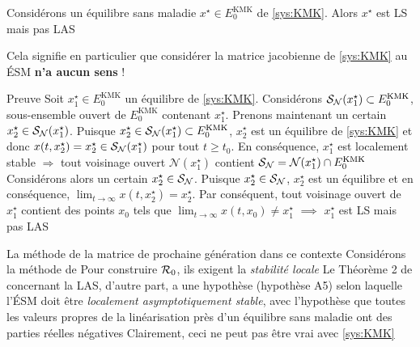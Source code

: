 \documentclass[aspectratio=169]{beamer}\usepackage[]{graphicx}\usepackage[]{xcolor}
\begin{document}
\begin{frame}
\begin{proposition}
Considérons un équilibre sans maladie $x^\star\in E_0^\text{KMK}$ de \eqref{sys:KMK}. Alors $x^\star$ est LS mais pas LAS  
\end{proposition}
\vfill
Cela signifie en particulier que considérer la matrice jacobienne de \eqref{sys:KMK} au ÉSM \textbf{n'a aucun sens} !
\end{frame}

\begin{frame}{Preuve}
Soit $x_1^\star\in E_0^\text{KMK}$ un équilibre de \eqref{sys:KMK}.
Considérons $\S_\mathcal{N}(x_1^\star)\subset E_0^\text{KMK}$, sous-ensemble ouvert de $E_0^\text{KMK}$ contenant $x_1^\star$.
Prenons maintenant un certain $x_2^\star\in\S_\mathcal{N}(x_1^\star)$. Puisque $x_2^\star\in\S_\mathcal{N}(x_1^\star)\subset E_0^\text{KMK}$, $x_2^\star$ est un équilibre de \eqref{sys:KMK} et donc $x(t,x_2^\star)=x_2^\star\in\S_\mathcal{N}(x_1^\star)$ pour tout $t\geq t_0$.
En conséquence, $x_1^\star$ est localement stable
\vfill
$\Rightarrow$ tout voisinage ouvert $\mathcal{N}(x_1^\star)$ contient $\S_\mathcal{N}=\mathcal{N}(x_1^\star)\cap E_0^\text{KMK}$
\vfill
Considérons alors un certain $x_2^\star\in\S_\mathcal{N}$.
Puisque $x_2^\star\in\S_\mathcal{N}$, $x_2^\star$ est un équilibre et en conséquence, $\lim_{t\to\infty}x(t,x_2^\star)=x_2^\star$.
Par conséquent, tout voisinage ouvert de $x_1^\star$ contient des points $x_0$ tels que $\lim_{t\to\infty}x(t,x_0)\neq x_1^\star$ $\implies$ $x_1^\star$ est LS mais pas LAS
\end{frame}

\begin{frame}{La méthode de la matrice de prochaine génération dans ce contexte}
Considérons la méthode de \cite{VdDWatmough2002}
\vfill
Pour construire $\R_0$, ils exigent la \emph{stabilité locale}
\vfill
Le Théorème 2 de \cite{VdDWatmough2002} concernant la LAS, d'autre part, a une hypothèse (hypothèse A5) selon laquelle l'ÉSM doit être \emph{localement asymptotiquement stable}, avec l'hypothèse que toutes les valeurs propres de la linéarisation près d'un équilibre sans maladie ont des parties réelles négatives
\vfill
Clairement, ceci ne peut pas être vrai avec \eqref{sys:KMK}
\end{frame}
\end{document}
